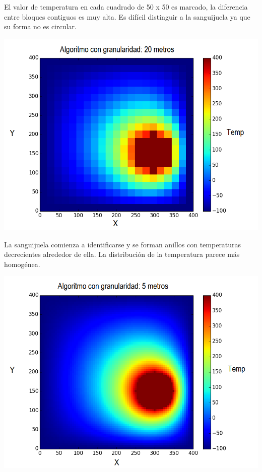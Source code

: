 	El valor de temperatura en cada cuadrado de 50 x 50 es marcado, la diferencia entre bloques contiguos es muy alta. Es difícil distinguir a la sanguijuela ya que su forma no es circular.

	\begin{center}
		\includegraphics[scale=0.5]{./img/granularidad/g20_t400_sinkill.png}
	\end{center}

	La sanguijuela comienza a identificarse y se forman anillos con temperaturas decrecientes alrededor de ella. La distribución de la temperatura parece más homogénea.

	\begin{center}
		\includegraphics[scale=0.5]{./img/granularidad/g5_t400_sinkill.png}
	\end{center}

